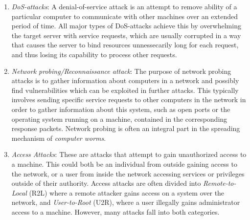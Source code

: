 \begin{enumerate}
\item \textit{DoS-attacks}: A denial-of-service attack is an attempt to remove ability of a particular computer to communicate with other machines over an extended period of time. %
All major types of DoS-attacks achieve this by overwhelming the target server with service requests, which are usually corrupted in a way that causes the server to bind resources unnessecarily long for each request, and thus losing its capability to process other requests. %

\item \textit{Network probing/Reconnaissance attack}: The purpose of network probing attacks is to gather information about computers in a network and possibly find vulnerabilities which can be exploited in further attacks. This typically involves sending specific service requests to other computers in the network in order to gather information about this system, such as open ports or the operating system running on a machine, contained in the corresponding response packets.
Network probing is often an integral part in the spreading mechanism of \textit{computer worms}.

\item \textit{Access Attacks}: These are attacks that attempt to gain unauthorized access to a machine. This could both be an individual from outside gaining access to the network, or a user from inside the network accessing services or privileges outside of their authority. Access attacks are often divided into \textit{Remote-to-Local} (R2L) where a remote attacker gains access on a system over the network, and \textit{User-to-Root} (U2R), where a user illegally gains administrator access to a machine. However, many attacks fall into both categories. 


\end{enumerate}
